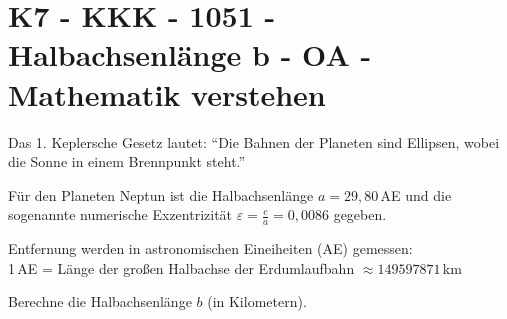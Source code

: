 \section{K7 - KKK - 1051 - Halbachsenlänge b - OA - Mathematik verstehen}

\begin{beispiel}[K7 - KKK]{1}
Das 1. Keplersche Gesetz lautet: "`Die Bahnen der Planeten sind Ellipsen, wobei die Sonne in einem Brennpunkt steht."'

Für den Planeten Neptun ist die Halbachsenlänge $a=29,80$\,AE und die sogenannte numerische Exzentrizität $\varepsilon=\frac{e}{a}=0,0086$ gegeben. 

Entfernung werden in astronomischen Eineiheiten (AE) gemessen:\\
1\,AE = Länge der großen Halbachse der Erdumlaufbahn $\approx 149597871$\,km

Berechne die Halbachsenlänge $b$ (in Kilometern).\leer

\end{beispiel}